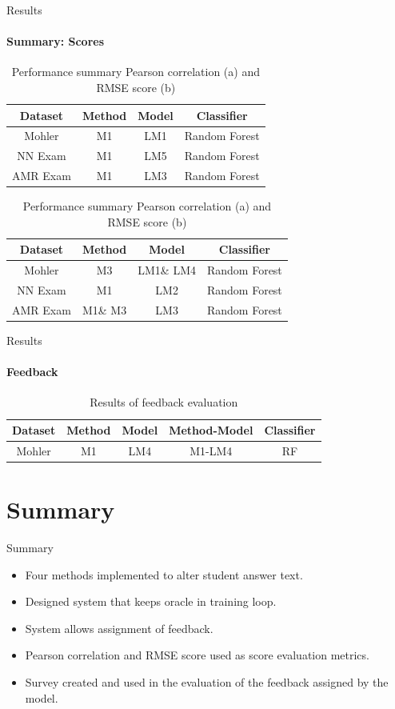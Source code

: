 \documentclass[aspectratio=169]{beamer}
\begin{document}
\begin{frame}{Results}
	\framesubtitle{Summary: Scores}
	\begin{table}
	\begin{subtable}[c]{0.7\textwidth}
				\centering
				\begin{tabular}{|c|c|c|c|}
					\hline
					Dataset & Method & Model & Classifier \\
					\hline
					Mohler & M1 & LM1& Random Forest \\
					\hline
					NN Exam & M1 & LM5 & Random Forest\\
					\hline
					AMR Exam & M1& LM3 & Random Forest\\
					\hline	
				\end{tabular}
			\subcaption{}
			\end{subtable}
		\begin{subtable}[c]{0.7\textwidth}
			
			\centering
			\begin{tabular}{|c|c|c|c|}
				\hline
				Dataset & Method & Model & Classifier \\
				\hline
				Mohler & M3 & LM1\& LM4& Random Forest \\
				\hline
				NN Exam & M1 & LM2 & Random Forest\\
				\hline
				AMR Exam & M1\& M3 & LM3 & Random Forest\\
				\hline	
			\end{tabular}
			\subcaption{}
		\end{subtable}
	\caption{Performance summary Pearson correlation (a) and RMSE score (b)}
\end{table}
\end{frame}

\begin{frame}{Results}
	\framesubtitle{Feedback}
	\begin{table}
		\centering
		\begin{tabular}{|c|c|c|c|c|}
			\hline
			Dataset & Method & Model & Method-Model & Classifier \\
			\hline
			Mohler & M1 & LM4 & M1-LM4 & RF \\
			\hline
		\end{tabular}
	\caption{Results of feedback evaluation}
	\end{table}
\end{frame}
\section{Summary}
\begin{frame}{Summary}
	\begin{itemize}
		\item Four methods implemented to alter student answer text.
		\item Designed system that keeps oracle in training loop.
		\item System allows assignment of feedback.
		\item Pearson correlation and RMSE score used as score evaluation metrics.
		\item Survey created and used in the evaluation of the feedback assigned by the model.
	\end{itemize}
\end{frame}
\end{document}
